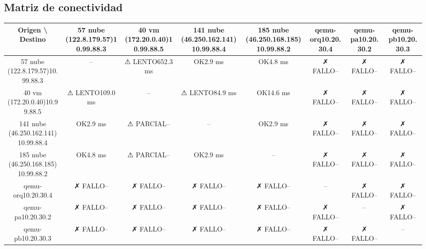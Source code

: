 \documentclass[11pt,a4paper]{article}
\begin{document}
\subsection{Matriz de conectividad}
\begin{longtable}{|c|c|c|c|c|c|c|c|}
\hline
Origen \textbackslash{} Destino & 57 nube (122.8.179.57)10.99.88.3 & 40 vm (172.20.0.40)10.99.88.5 & 141 nube (46.250.162.141)10.99.88.4 & 185 nube (46.250.168.185)10.99.88.2 & qemu-orq10.20.30.4 & qemu-pa10.20.30.2 & qemu-pb10.20.30.3 \\ \hline
57 nube (122.8.179.57)10.99.88.3 & -- & ⚠ LENTO652.3 ms & OK2.9 ms & OK4.8 ms & ✗ FALLO-- & ✗ FALLO-- & ✗ FALLO-- \\ \hline
40 vm (172.20.0.40)10.99.88.5 & ⚠ LENTO109.0 ms & -- & ⚠ LENTO84.9 ms & OK14.6 ms & ✗ FALLO-- & ✗ FALLO-- & ✗ FALLO-- \\ \hline
141 nube (46.250.162.141)10.99.88.4 & OK2.9 ms & ⚠ PARCIAL-- & -- & OK2.9 ms & ✗ FALLO-- & ✗ FALLO-- & ✗ FALLO-- \\ \hline
185 nube (46.250.168.185)10.99.88.2 & OK4.8 ms & ⚠ PARCIAL-- & OK2.9 ms & -- & ✗ FALLO-- & ✗ FALLO-- & ✗ FALLO-- \\ \hline
qemu-orq10.20.30.4 & ✗ FALLO-- & ✗ FALLO-- & ✗ FALLO-- & ✗ FALLO-- & -- & ✗ FALLO-- & ✗ FALLO-- \\ \hline
qemu-pa10.20.30.2 & ✗ FALLO-- & ✗ FALLO-- & ✗ FALLO-- & ✗ FALLO-- & ✗ FALLO-- & -- & ✗ FALLO-- \\ \hline
qemu-pb10.20.30.3 & ✗ FALLO-- & ✗ FALLO-- & ✗ FALLO-- & ✗ FALLO-- & ✗ FALLO-- & ✗ FALLO-- & -- \\ \hline
\end{longtable}
\end{document}
